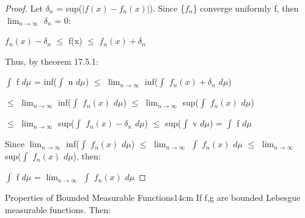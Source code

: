     \begin{proof}
        Let $\delta_n$ = sup($|f(x) - f_n(x)|$).
        Since \{$f_n$\} converge uniformly f, then
        $\lim_{n \rightarrow \infty}$ $\delta_n$ = 0:

        \hspace{0.5cm}
        $f_n(x) - \delta_n$ $\leq$ f(x) $\leq$ $f_n(x) + \delta_n$

        Thus, by {\color{red} theorem 17.5.1}:

        \hspace{0.5cm}
        $\int$ f $d\mu$
        = inf($\int$ u $d\mu$)
        $\leq$ $\lim_{n \rightarrow \infty}$ inf($\int$ $f_n(x) + \delta_n$ $d\mu$)

        \hspace{0.5cm}
        $\leq$ $\lim_{n \rightarrow \infty}$ inf($\int$ $f_n(x)$ $d\mu$)
        $\leq$ $\lim_{n \rightarrow \infty}$ sup($\int$ $f_n(x)$ $d\mu$)

        \hspace{0.5cm}
        $\leq$ $\lim_{n \rightarrow \infty}$ sup($\int$ $f_n(x) - \delta_n$ $d\mu$)
        $\leq$ sup($\int$ v $d\mu$)
        = $\int$ f $d\mu$

        Since
        $\lim_{n \rightarrow \infty}$ inf($\int$ $f_n(x)$ $d\mu$)
        $\leq$ $\lim_{n \rightarrow \infty}$ $\int$ $f_n(x)$ $d\mu$
        $\leq$ $\lim_{n \rightarrow \infty}$ sup($\int$ $f_n(x)$ $d\mu$),
        then:

        \hspace{0.5cm}
        $\int$ f $d\mu$
        = $\lim_{n \rightarrow \infty}$ $\int$ $f_n(x)$ $d\mu$
    \end{proof}

    \newpage



    \begin{wtheorem}{Properties of Bounded Measurable Functions}{14cm}
        If f,g are bounded Lebesgue measurable functions. Then:
    \end{wtheorem}


